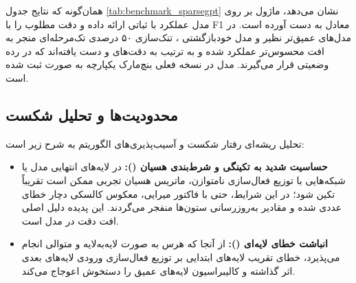 همان‌گونه که نتایج جدول \ref{tab:benchmark_sparsegpt} نشان می‌دهد، ماژول  بر روی مدل  عملکرد با ثباتی ارائه داده و دقت مطلوب  را با F1 معادل  به دست آورده است. در مدل‌های عمیق‌تر نظیر  و مدل خودبازگشتی ، تنک‌سازی ۵۰ درصدی تک‌مرحله‌ای منجر به افت محسوس‌تر عملکرد شده و به ترتیب به دقت‌های  و  دست یافته‌اند که در رده وضعیتی  قرار می‌گیرند. مدل  در نسخه فعلی بنچ‌مارک یکپارچه به صورت  ثبت شده است.

\subsection{محدودیت‌ها و تحلیل شکست}
تحلیل ریشه‌ای رفتار شکست و آسیب‌پذیری‌های الگوریتم  به شرح زیر است:
\begin{itemize}
    \item \textbf{حساسیت شدید به تکینگی و شرط‌بندی هسیان ():} در لایه‌های انتهایی مدل یا شبکه‌هایی با توزیع فعال‌سازی نامتوازن، ماتریس هسیان تجربی ممکن است تقریباً تکین شود؛ در این شرایط، حتی با فاکتور میرایی، معکوس کالسکی دچار خطای عددی شده و مقادیر به‌روزرسانی ستون‌ها منفجر می‌گردند. این پدیده دلیل اصلی افت دقت در مدل  است.
    \item \textbf{انباشت خطای لایه‌ای ():} از آنجا که هرس به صورت لایه‌به‌لایه و متوالی انجام می‌پذیرد، خطای تقریب لایه‌های ابتدایی بر توزیع فعال‌سازی ورودی لایه‌های بعدی اثر گذاشته و کالیبراسیون لایه‌های عمیق را دستخوش اعوجاج می‌کند.
\end{itemize}
